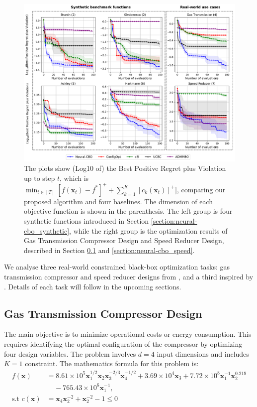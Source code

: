 \begin{figure}[h]
    \centering
   \includegraphics[width=\textwidth]{Figures/Neural-CBO/Branin-Simionescu-GasTransmission-Ackley-Hartmann-SpeedReducer.pdf}
    \caption{The plots show (Log10 of) the Best Positive Regret plus Violation up to step $t$, which is $\min_{t \in [T]} [f(\mathbf{x}_t) - f^*]^+ + \sum_{k=1}^K [c_k(\mathbf{x}_t)]^+ ]$, comparing our proposed algorithm and four baselines. The dimension of each objective function is shown in the parenthesis. The left group is four synthetic functions introduced in Section \ref{section:neural-cbo_synthetic}, while the right group is the optimization results of Gas Transmission Compressor Design and Speed Reducer Design, described in Section  \ref{section:neural-cbo_gas} and \ref{section:neural-cbo_speed}.}
    
    \label{fig:neural-cbo_synthetic}
\end{figure}

We analyse three real-world constrained black-box optimization tasks: gas transmission compressor and speed reducer designs from \citet{kumar2020test}, and a third inspired by \citet{he2018verideep}. Details of each task will follow in the upcoming sections.  
\subsection{Gas Transmission Compressor Design}
\label{section:neural-cbo_gas}
     The main objective is to minimize operational costs or energy consumption. This requires identifying the optimal configuration of the compressor by optimizing four design variables. The problem involves $d = 4$ input dimensions and includes $K = 1$ constraint. The mathematics formula for this problem is:
    \begin{align*}
        f(\mathbf{x}) & = 8.61 \times 10^5\mathbf{x}_1^{1/2} \mathbf{x}_2\mathbf{x}_3^{-2/3} \mathbf{x}_4^{-1/2}  + 3.69 \times 10^4\mathbf{x}_3 + 7.72 \times 10^8 \mathbf{x}_1^{-1} \mathbf{x}_2^{0.219} \\
        & \;\;\; \; - 765.43 \times 10^6\mathbf{x}_1^{-1},
        \\
        \text{s.t }  c(\mathbf{x}) &= \mathbf{x}_4\mathbf{x}_2^{-2} + \mathbf{x}_2^{-2} - 1 \le 0
    \end{align*}

